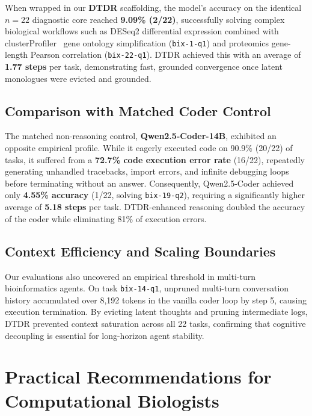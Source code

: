 \documentclass[11pt,letterpaper]{article}
\begin{document}
When wrapped in our \textbf{DTDR} scaffolding, the model's accuracy on the identical $n=22$ diagnostic core reached \textbf{9.09\% (2/22)}, successfully solving complex biological workflows such as DESeq2 differential expression combined with clusterProfiler~\cite{wu2021clusterprofiler} gene ontology simplification (\texttt{bix-1-q1}) and proteomics gene-length Pearson correlation (\texttt{bix-22-q1}). DTDR achieved this with an average of \textbf{1.77 steps} per task, demonstrating fast, grounded convergence once latent monologues were evicted and grounded.

\subsection{Comparison with Matched Coder Control}
The matched non-reasoning control, \textbf{Qwen2.5-Coder-14B}, exhibited an opposite empirical profile. While it eagerly executed code on 90.9\% (20/22) of tasks, it suffered from a \textbf{72.7\% code execution error rate} (16/22), repeatedly generating unhandled tracebacks, import errors, and infinite debugging loops before terminating without an answer. Consequently, Qwen2.5-Coder achieved only \textbf{4.55\% accuracy} (1/22, solving \texttt{bix-19-q2}), requiring a significantly higher average of \textbf{5.18 steps} per task. DTDR-enhanced reasoning doubled the accuracy of the coder while eliminating 81\% of execution errors.

\subsection{Context Efficiency and Scaling Boundaries}
Our evaluations also uncovered an empirical threshold in multi-turn bioinformatics agents. On task \texttt{bix-14-q1}, unpruned multi-turn conversation history accumulated over 8,192 tokens in the vanilla coder loop by step 5, causing execution termination. By evicting latent thoughts and pruning intermediate logs, DTDR prevented context saturation across all 22 tasks, confirming that cognitive decoupling is essential for long-horizon agent stability.

\section{Practical Recommendations for Computational Biologists}
\end{document}
